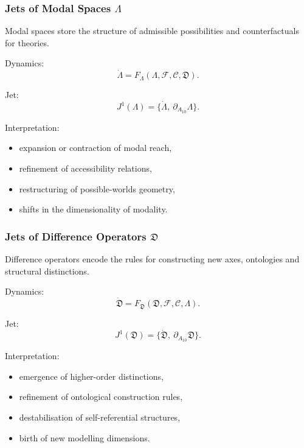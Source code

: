 \subsubsection{Jets of Modal Spaces \texorpdfstring{$\Lambda$}{\Lambda}}

Modal spaces store the structure of admissible possibilities and
counterfactuals for theories.

Dynamics:
\[
\dot{\Lambda}
=
F_{\Lambda}(\Lambda,\mathcal{F},\mathcal{C},\mathfrak{D}).
\]

Jet:
\[
J^1(\Lambda)=\{\dot{\Lambda},\ \partial_{A_{10}}\Lambda\}.
\]

Interpretation:
\begin{itemize}
    \item expansion or contraction of modal reach,
    \item refinement of accessibility relations,
    \item restructuring of possible-worlds geometry,
    \item shifts in the dimensionality of modality.
\end{itemize}


\subsubsection{Jets of Difference Operators $\mathfrak{D}$}

Difference operators encode the rules for constructing new axes,
ontologies and structural distinctions.

Dynamics:
\[
\dot{\mathfrak{D}}
=
F_{\mathfrak{D}}(\mathfrak{D},\mathcal{F},\mathcal{C},\Lambda).
\]

Jet:
\[
J^1(\mathfrak{D}) =
\{\dot{\mathfrak{D}},\ \partial_{A_{10}}\mathfrak{D}\}.
\]

Interpretation:
\begin{itemize}
    \item emergence of higher-order distinctions,
    \item refinement of ontological construction rules,
    \item destabilisation of self-referential structures,
    \item birth of new modelling dimensions.
\end{itemize}


